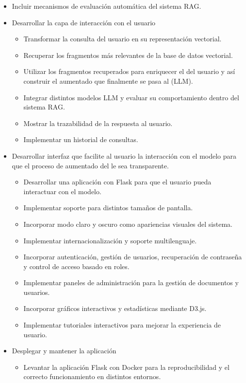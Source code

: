 \begin{itemize}
	\item Incluir mecanismos de evaluación automática del sistema RAG.
	\item Desarrollar la capa de interacción con el usuario
	\begin{itemize}
	\tightlist
		\item Transformar la consulta del usuario en su representación vectorial.
		\item Recuperar los fragmentos más relevantes de la base de datos vectorial.
		\item Utilizar los fragmentos recuperados para enriquecer el  del usuario y así construir el  aumentado que finalmente se pasa al  (LLM).
		\item Integrar distintos modelos LLM y evaluar su comportamiento dentro del sistema RAG.
		\item Mostrar la trazabilidad de la respuesta al usuario.
		\item Implementar un historial de consultas. 
	\end{itemize}
	\item Desarrollar interfaz que facilite al usuario la interacción con el modelo para que el proceso de aumentado del  le sea transparente.
	\begin{itemize}
	\tightlist
		\item Desarrollar una aplicación  con Flask para que el usuario pueda interactuar con el modelo.
		\item Implementar soporte  para distintos tamaños de pantalla.
		\item Incorporar modo claro y oscuro como apariencias visuales del sistema.
		\item Implementar internacionalización y soporte multilenguaje.
		\item Incorporar autenticación, gestión de usuarios, recuperación de contraseña y control de acceso basado en roles.
		\item Implementar paneles de administración para la gestión de documentos y usuarios.
		\item Incorporar gráficos interactivos y estadísticas mediante D3.js.
		\item Implementar tutoriales interactivos para mejorar la experiencia de usuario.
	\end{itemize}
	\item Desplegar y mantener la aplicación
	\begin{itemize}
	\tightlist
		\item Levantar la aplicación Flask con Docker para la reproducibilidad y el correcto funcionamiento en distintos entornos.

\end{itemize}
\end{itemize}
